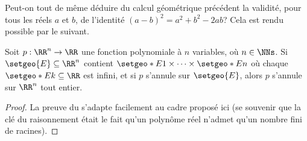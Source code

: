 Peut-on tout de même déduire du calcul géométrique précédent la validité, pour tous les réels $a$ et $b$, de l'identité $(a - b)^2 = a^2 + b^2 - 2ab$?
Cela est rendu possible par le  suivant. 


\medskip

\begin{fact} \label{poly-nullity-interval}
	Soit $p: \RR^n \rightarrow \RR$ une fonction polynomiale à $n$ variables, où $n \in \NNs$.
	Si $\setgeo{E} \subseteq \RR^n$ contient $\setgeo*{E}{1} \times \cdots \times \setgeo*{E}{n}$ où chaque $\setgeo*{E}{k} \subseteq \RR$ est infini,
	et si $p$ s'annule sur $\setgeo{E}$,
	alors $p$ s'annule sur $\RR^n$ tout entier. 
\end{fact}


\begin{proof}
	La preuve du  s'adapte facilement au cadre proposé ici (se souvenir que la clé du raisonnement était le fait qu'un polynôme réel n'admet qu'un nombre fini de racines).
\end{proof}




\medskip

